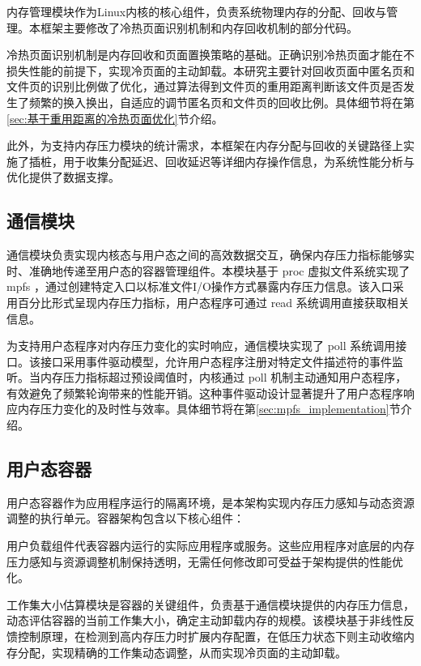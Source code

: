 内存管理模块作为Linux内核的核心组件，负责系统物理内存的分配、回收与管理。本框架主要修改了冷热页面识别机制和内存回收机制的部分代码。

冷热页面识别机制是内存回收和页面置换策略的基础。正确识别冷热页面才能在不损失性能的前提下，实现冷页面的主动卸载。本研究主要针对回收页面中匿名页和文件页的识别比例做了优化，通过算法得到文件页的重用距离判断该文件页是否发生了频繁的换入换出，自适应的调节匿名页和文件页的回收比例。具体细节将在第\ref{sec:基于重用距离的冷热页面优化}节介绍。

此外，为支持内存压力模块的统计需求，本框架在内存分配与回收的关键路径上实施了插桩，用于收集分配延迟、回收延迟等详细内存操作信息，为系统性能分析与优化提供了数据支撑。


\subsection{通信模块}

通信模块负责实现内核态与用户态之间的高效数据交互，确保内存压力指标能够实时、准确地传递至用户态的容器管理组件。本模块基于 proc 虚拟文件系统实现了 mpfs ，通过创建特定入口以标准文件I/O操作方式暴露内存压力信息。该入口采用百分比形式呈现内存压力指标，用户态程序可通过 read 系统调用直接获取相关信息。

为支持用户态程序对内存压力变化的实时响应，通信模块实现了 poll 系统调用接口。该接口采用事件驱动模型，允许用户态程序注册对特定文件描述符的事件监听。当内存压力指标超过预设阈值时，内核通过 poll 机制主动通知用户态程序，有效避免了频繁轮询带来的性能开销。这种事件驱动设计显著提升了用户态程序响应内存压力变化的及时性与效率。具体细节将在第\ref{sec:mpfs_implementation}节介绍。

\subsection{用户态容器}

用户态容器作为应用程序运行的隔离环境，是本架构实现内存压力感知与动态资源调整的执行单元。容器架构包含以下核心组件：

用户负载组件代表容器内运行的实际应用程序或服务。这些应用程序对底层的内存压力感知与资源调整机制保持透明，无需任何修改即可受益于架构提供的性能优化。

工作集大小估算模块是容器的关键组件，负责基于通信模块提供的内存压力信息，动态评估容器的当前工作集大小，确定主动卸载内存的规模。该模块基于非线性反馈控制原理，在检测到高内存压力时扩展内存配置，在低压力状态下则主动收缩内存分配，实现精确的工作集动态调整，从而实现冷页面的主动卸载。


